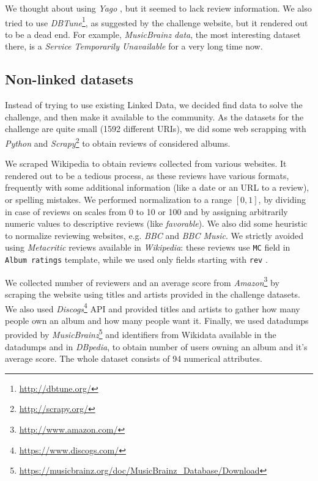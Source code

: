 \documentclass{llncs}
\begin{document}
We thought about using \emph{Yago} \cite{yago}, but it seemed to lack review information.
We also tried to use \emph{DBTune}\footnote{\url{http://dbtune.org/}}, as suggested by the challenge website, but it rendered out to be a dead end.
For example, \emph{MusicBrainz data}, the most interesting dataset there, is a \emph{Service Temporarily Unavailable} for a very long time now.

\subsection{Non-linked datasets\label{sec:nonld}}
Instead of trying to use existing Linked Data, we decided find data to solve the challenge, and then make it available to the community.
As the datasets for the challenge are quite small (1592 different URIs), we did some web scrapping with \emph{Python} and \emph{Scrapy}\footnote{\url{http://scrapy.org/}} to obtain reviews of considered albums.

We scraped Wikipedia to obtain reviews collected from various websites.
It rendered out to be a tedious process, as these reviews have various formats, frequently with some additional information (like a date or an URL to a review), or spelling mistakes.
We performed normalization to a range $\left[0,1\right]$, by dividing in case of reviews on scales from 0 to 10 or 100 and by assigning arbitrarily numeric values to descriptive reviews (like \emph{favorable}).
We also did some heuristic to normalize reviewing websites, e.g. \emph{BBC} and \emph{BBC Music}.
We strictly avoided using \emph{Metacritic} reviews available in \emph{Wikipedia}: these reviews use \texttt{MC} field in \texttt{Album ratings} template, while we used only fields starting with \texttt{rev} \cite{album_ratings}.

We collected number of reviewers and an average score from \emph{Amazon}\footnote{\url{http://www.amazon.com/}} by scraping the website using titles and artists provided in the challenge datasets.
We also used \emph{Discogs}\footnote{\url{https://www.discogs.com/}} API and provided titles and artists to gather how many people own an album and how many people want it.
Finally, we used datadumps provided by \emph{MusicBrainz}\footnote{\url{https://musicbrainz.org/doc/MusicBrainz_Database/Download}} \cite{musicbrainz} and identifiers from Wikidata \cite{wikidata} available in the datadumps and in \emph{DBpedia}, to obtain number of users owning an album and it's average score.
The whole dataset consists of 94 numerical attributes.
\end{document}
